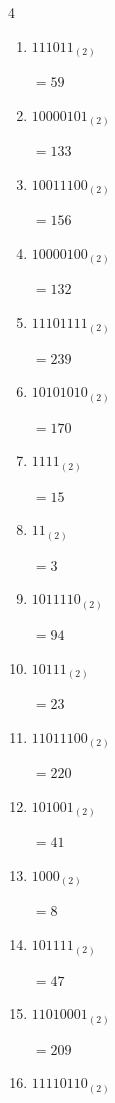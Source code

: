 \begin{multicols}{4}
\begin{enumerate}
        $=224$

  \item $111011_{(2)}$

        $=59$

\columnbreak %

\resetques

  \item $10000101_{(2)}$

        $=133$

  \item $10011100_{(2)}$

        $=156$

  \item $10000100_{(2)}$

        $=132$

  \item $11101111_{(2)}$

        $=239$

  \item $10101010_{(2)}$

        $=170$

  \item $1111_{(2)}$

        $=15$

  \item $11_{(2)}$

        $=3$

  \item $1011110_{(2)}$

        $=94$

  \item $10111_{(2)}$

        $=23$

  \item $11011100_{(2)}$

        $=220$

  \item $101001_{(2)}$

        $=41$

  \item $1000_{(2)}$

        $=8$

  \item $101111_{(2)}$

        $=47$

  \item $11010001_{(2)}$

        $=209$

  \item $11110110_{(2)}$


\end{enumerate}
\end{multicols}
